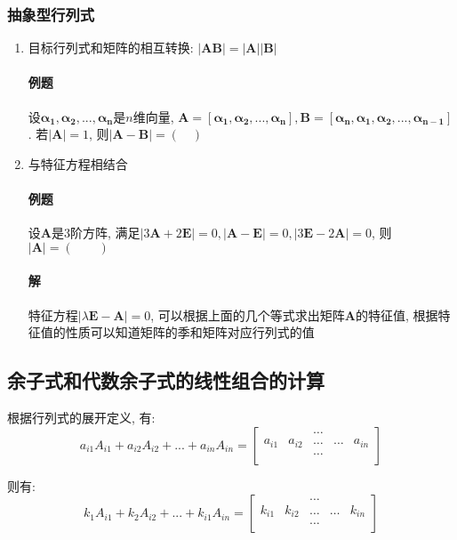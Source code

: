 \subsubsection{抽象型行列式}
\begin{enumerate}
\item 目标行列式和矩阵的相互转换: $|\bm{A}\bm{B}|=|\bm{A}||\bm{B}|$
\paragraph{例题} 设$\bm{\alpha_{1}},\bm{\alpha_{2}},...,\bm{\alpha_{n}}$是$n$维向量, $\bm{A}=[\bm{\alpha_{1}},\bm{\alpha_{2}},...,\bm{\alpha_{n}}],\bm{B}=[\bm{\alpha_{n}},\bm{\alpha_{1}},\bm{\alpha_{2}},...,\bm{\alpha_{n-1}}]$. 若$|\bm{A}|=1$, 则$|\bm{A}-\bm{B}|=(\quad)$\par
\item 与特征方程相结合
\paragraph{例题} 设$\bm{A}$是$ 3 $阶方阵, 满足$ |3 \bm{A}+2 \bm{E}|=0, |\bm{A} - \bm{E}|=0, |3 \bm{E}-2 \bm{A}|=0 $, 则$ |\bm{A}|=(\qquad) $
\paragraph{解} 特征方程$ |\lambda \bm{E}-\bm{A}|=0 $, 可以根据上面的几个等式求出矩阵$ \bm{A} $的特征值, 根据特征值的性质可以知道矩阵的季和矩阵对应行列式的值
\end{enumerate}
\subsection{余子式和代数余子式的线性组合的计算}
根据行列式的展开定义, 有:
\begin{equation*}
a_{i1}A_{i1}+a_{i2}A_{i2}+...+a_{in}A_{in}=
\begin{bmatrix}
 &  & \dots &  & \\
a_{i1} & a_{i2} & \dots & \dots & a_{in} \\
 &  & \dots &  & \\
\end{bmatrix}
\end{equation*}\par
则有:
\begin{equation*}
k_{1}A_{i1}+k_{2}A_{i2}+...+k_{i1}A_{in}=
\begin{bmatrix}
&  & \dots &  & \\
k_{i1} & k_{i2} & \dots & \dots & k_{in} \\
&  & \dots &  & \\
\end{bmatrix}
\end{equation*}\par
